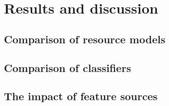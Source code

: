 \chapter{Results and discussion\label{results}}
\section{Comparison of resource models\label{model-results}}
\section{Comparison of classifiers\label{classifier-results}}
\section{The impact of feature sources\label{feature-results}}